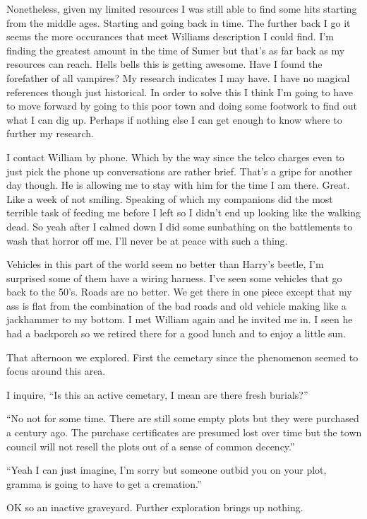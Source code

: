 Nonetheless, given my limited resources I was still able to find some hits starting from the middle ages. Starting and going back in time. The further back I go it seems the more occurances that meet Williams description I could find. I'm finding the greatest amount in the time of Sumer but that's as far back as my resources can reach. Hells bells this is getting awesome. Have I found the forefather of all vampires? My research indicates I may have. I have no magical references though just historical. In order to solve this I think I'm going to have to move forward by going to this poor town and doing some footwork to find out what I can dig up. Perhaps if nothing else I can get enough to know where to further my research.

I contact William by phone. Which by the way since the telco charges even to just pick the phone up conversations are rather brief. That's a gripe for another day though. He is allowing me to stay with him for the time I am there. Great. Like a week of not smiling. Speaking of which my companions did the most terrible task of feeding me before I left so I didn't end up looking like the walking dead. So yeah after I calmed down I did some sunbathing on the battlements to wash that horror off me. I'll never be at peace with such a thing.

Vehicles in this part of the world seem no better than Harry's beetle, I'm surprised some of them have a wiring harness. I've seen some vehicles that go back to the 50's. Roads are no better. We get there in one piece except that my ass is flat from the combination of the bad roads and old vehicle making like a jackhammer to my bottom. I met William again and he invited me in. I seen he had a backporch so we retired there for a good lunch and to enjoy a little sun.

That afternoon we explored. First the cemetary since the phenomenon seemed to focus around this area. 

I inquire, ``Is this an active cemetary, I mean are there fresh burials?'' 

``No not for some time. There are still some empty plots but they were purchased a century ago. The purchase certificates are presumed lost over time but the town council will not resell the plots out of a sense of common decency.'' 

``Yeah I can just imagine, I'm sorry but someone outbid you on your plot, gramma is going to have to get a cremation.''

OK so an inactive graveyard. Further exploration brings up nothing.

